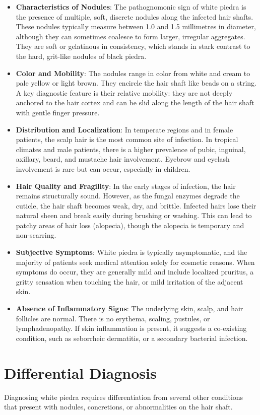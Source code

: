 \begin{itemize}
    \item \textbf{Characteristics of Nodules}: The pathognomonic sign of white piedra is the presence of multiple, soft, discrete nodules along the infected hair shafts. These nodules typically measure between 1.0 and 1.5 millimetres in diameter, although they can sometimes coalesce to form larger, irregular aggregates. They are soft or gelatinous in consistency, which stands in stark contrast to the hard, grit-like nodules of black piedra.
    \item \textbf{Color and Mobility}: The nodules range in color from white and cream to pale yellow or light brown. They encircle the hair shaft like beads on a string. A key diagnostic feature is their relative mobility: they are not deeply anchored to the hair cortex and can be slid along the length of the hair shaft with gentle finger pressure.
    \item \textbf{Distribution and Localization}: In temperate regions and in female patients, the scalp hair is the most common site of infection. In tropical climates and male patients, there is a higher prevalence of pubic, inguinal, axillary, beard, and mustache hair involvement. Eyebrow and eyelash involvement is rare but can occur, especially in children.
    \item \textbf{Hair Quality and Fragility}: In the early stages of infection, the hair remains structurally sound. However, as the fungal enzymes degrade the cuticle, the hair shaft becomes weak, dry, and brittle. Infected hairs lose their natural sheen and break easily during brushing or washing. This can lead to patchy areas of hair loss (alopecia), though the alopecia is temporary and non-scarring.
    \item \textbf{Subjective Symptoms}: White piedra is typically asymptomatic, and the majority of patients seek medical attention solely for cosmetic reasons. When symptoms do occur, they are generally mild and include localized pruritus, a gritty sensation when touching the hair, or mild irritation of the adjacent skin.
    \item \textbf{Absence of Inflammatory Signs}: The underlying skin, scalp, and hair follicles are normal. There is no erythema, scaling, pustules, or lymphadenopathy. If skin inflammation is present, it suggests a co-existing condition, such as seborrheic dermatitis, or a secondary bacterial infection.
\end{itemize}

\section*{Differential Diagnosis}
Diagnosing white piedra requires differentiation from several other conditions that present with nodules, concretions, or abnormalities on the hair shaft.

